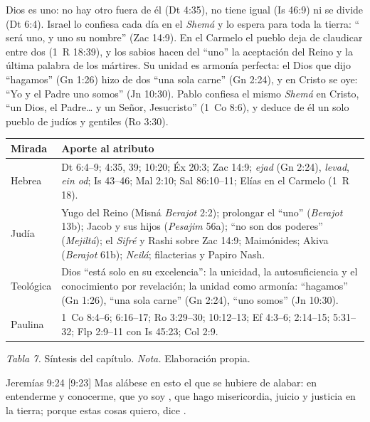 \begin{tcolorbox}[colback=papiro,colframe=azul,boxrule=1pt,arc=3pt]
Dios es uno: no hay otro fuera de él (Dt 4:35), no tiene igual (Is 46:9) ni se divide (Dt 6:4). Israel lo confiesa cada día en el \emph{Shemá} y lo espera para toda la tierra: ``\SENOR{} será uno, y uno su nombre'' (Zac 14:9). En el Carmelo el pueblo deja de claudicar entre dos (1~R 18:39), y los sabios hacen del ``uno'' la aceptación del Reino y la última palabra de los mártires. Su unidad es armonía perfecta: el Dios que dijo ``hagamos'' (Gn 1:26) hizo de dos ``una sola carne'' (Gn 2:24), y en Cristo se oye: ``Yo y el Padre uno somos'' (Jn 10:30). Pablo confiesa el mismo \emph{Shemá} en Cristo, ``un Dios, el Padre\ldots{} y un Señor, Jesucristo'' (1~Co 8:6), y deduce de él un solo pueblo de judíos y gentiles (Ro 3:30).
\end{tcolorbox}

\begin{center}\small\renewcommand{\arraystretch}{1.3}
\begin{tabular}{@{}L{3.0cm}L{11.4cm}@{}}
\toprule
\textbf{Mirada} & \textbf{Aporte al atributo} \\ \midrule
Hebrea & Dt 6:4--9; 4:35, 39; 10:20; Éx 20:3; Zac 14:9; \emph{ejad} (Gn 2:24), \emph{levad}, \emph{ein od}; Is 43--46; Mal 2:10; Sal 86:10--11; Elías en el Carmelo (1~R 18). \\
Judía & Yugo del Reino (Misná \emph{Berajot} 2:2); prolongar el ``uno'' (\emph{Berajot} 13b); Jacob y sus hijos (\emph{Pesajim} 56a); ``no son dos poderes'' (\emph{Mejiltá}); el \emph{Sifré} y Rashi sobre Zac 14:9; Maimónides; Akiva (\emph{Berajot} 61b); \emph{Neilá}; filacterias y Papiro Nash. \\
Teológica & Dios ``está solo en su excelencia'': la unicidad, la autosuficiencia y el conocimiento por revelación; la unidad como armonía: ``hagamos'' (Gn 1:26), ``una sola carne'' (Gn 2:24), ``uno somos'' (Jn 10:30). \\
Paulina & 1~Co 8:4--6; 6:16--17; Ro 3:29--30; 10:12--13; Ef 4:3--6; 2:14--15; 5:31--32; Flp 2:9--11 con Is 45:23; Col 2:9. \\
\bottomrule
\end{tabular}\par
{\footnotesize\color{gris}\textit{Tabla 7.} Síntesis del capítulo. \textit{Nota.} Elaboración propia.}
\end{center}

\begin{verso}{Jeremías 9:24 [9:23]}
Mas alábese en esto el que se hubiere de alabar: en entenderme y conocerme, que yo soy \SENOR{}, que hago misericordia, juicio y justicia en la tierra; porque estas cosas quiero, dice \SENOR{}.
\end{verso}

